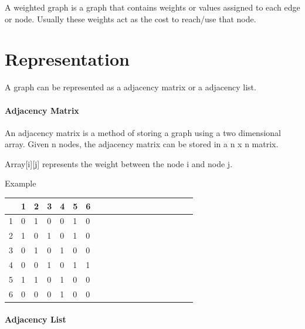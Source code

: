 \documentclass[11pt,oneside]{book}
\begin{document}
A weighted graph is a graph that contains weights or values assigned to each edge or node. Usually these weights act as the cost to reach/use that node.


    \chapter{ Representation }
        

A graph can be represented as a adjacency matrix or a adjacency list.

\subsubsection{Adjacency Matrix}



An adjacency matrix is a method of storing a graph using a two dimensional array. Given n nodes, the adjacency matrix can be stored in a n x n matrix.

Array[i][j] represents the weight between the node i and node j.

Example

\vspace{10pt} \begin{tabulary}{0.4\linewidth}{|l|l|l|l|l|l|l|l|l|l|l|l|l|l|l|l|l|l|l}\hline


   &
  1 &
  2 &
  3 &
  4 &
  5 &
  6\\
\hline


  1 &
  0 &
  1 &
  0 &
  0 &
  1 &
  0\\

  2 &
  1 &
  0 &
  1 &
  0 &
  1 &
  0\\

  3 &
  0 &
  1 &
  0 &
  1 &
  0 &
  0\\

  4 &
  0 &
  0 &
  1 &
  0 &
  1 &
  1\\

  5 &
  1 &
  1 &
  0 &
  1 &
  0 &
  0\\

  6 &
  0 &
  0 &
  0 &
  1 &
  0 &
  0\\

\hline\end{tabulary}



\subsubsection{Adjacency List}
\end{document}
